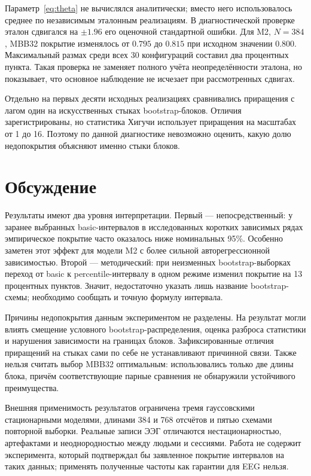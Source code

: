Параметр~\eqref{eq:theta} не вычислялся аналитически; вместо него использовалось среднее по независимым эталонным реализациям. В диагностической проверке эталон сдвигался на $\pm1.96$ его оценочной стандартной ошибки. Для M2, $N=384$, MBB32 покрытие изменялось от $0.795$ до $0.815$ при исходном значении $0.800$. Максимальный размах среди всех 30 конфигураций составил два процентных пункта. Такая проверка не заменяет полного учёта неопределённости эталона, но показывает, что основное наблюдение не исчезает при рассмотренных сдвигах.

Отдельно на первых десяти исходных реализациях сравнивались приращения с лагом один на искусственных стыках bootstrap-блоков. Отличия зарегистрированы, но статистика Хигучи использует приращения на масштабах от 1 до 16. Поэтому по данной диагностике невозможно оценить, какую долю недопокрытия объясняют именно стыки блоков.

\section{Обсуждение}

Результаты имеют два уровня интерпретации. Первый --- непосредственный: у заранее выбранных basic-интервалов в исследованных коротких зависимых рядах эмпирическое покрытие часто оказалось ниже номинальных 95\%. Особенно заметен этот эффект для модели M2 с более сильной авторегрессионной зависимостью. Второй --- методический: при неизменных bootstrap-выборках переход от basic к percentile-интервалу в одном режиме изменил покрытие на 13 процентных пунктов. Значит, недостаточно указать лишь название bootstrap-схемы; необходимо сообщать и точную формулу интервала.

Причины недопокрытия данным экспериментом не разделены. На результат могли влиять смещение условного bootstrap-распределения, оценка разброса статистики и нарушения зависимости на границах блоков. Зафиксированные отличия приращений на стыках сами по себе не устанавливают причинной связи. Также нельзя считать выбор MBB32 оптимальным: использовались только две длины блока, причём соответствующие парные сравнения не обнаружили устойчивого преимущества.

Внешняя применимость результатов ограничена тремя гауссовскими стационарными моделями, длинами 384 и 768 отсчётов и пятью схемами повторной выборки. Реальные записи ЭЭГ отличаются нестационарностью, артефактами и неоднородностью между людьми и сессиями. Работа не содержит эксперимента, который подтверждал бы заявленное покрытие интервалов на таких данных; применять полученные частоты как гарантии для EEG нельзя.

